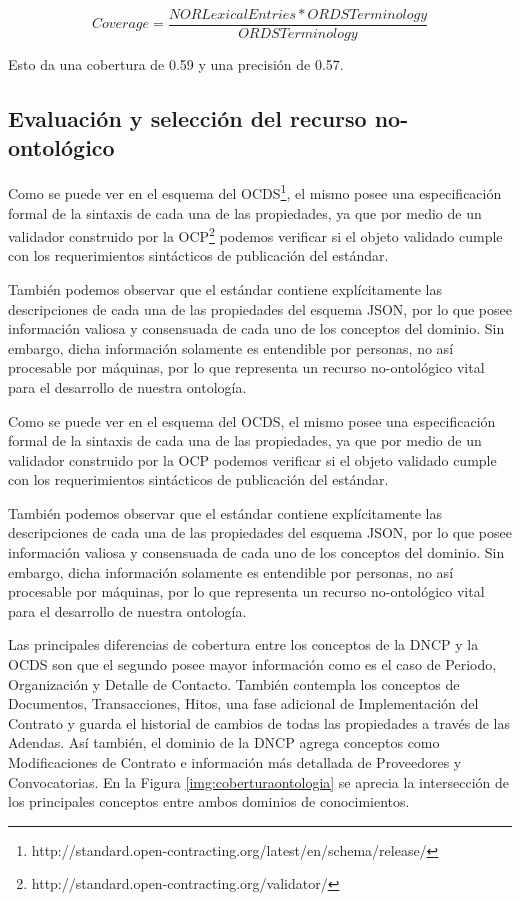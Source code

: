 \begin{equation}
    \label{eq:2}
     Coverage = \frac{{NORLexicalEntries}* {ORDSTerminology}}{{ORDSTerminology}}   
\end{equation}

Esto da una cobertura de 0.59 y una precisión de 0.57. 

\subsection{Evaluación y selección del recurso no-ontológico}

Como se puede ver en el esquema del OCDS\footnote{http://standard.open-contracting.org/latest/en/schema/release/}, el mismo posee una especificación formal de la sintaxis de cada una de las propiedades, ya que por medio de un validador construido por la OCP\footnote{http://standard.open-contracting.org/validator/} podemos verificar si el objeto validado cumple con los requerimientos sintácticos de publicación del estándar.

También podemos observar que el estándar contiene explícitamente las descripciones de cada una de las propiedades del esquema JSON, por lo que posee información valiosa y consensuada de cada uno de los conceptos del dominio. Sin embargo, dicha información solamente es entendible por personas, no así procesable por máquinas, por lo que representa un recurso no-ontológico vital para el desarrollo de nuestra ontología.

Como se puede ver en el esquema del OCDS, el mismo posee una especificación formal de la sintaxis de cada una de las propiedades, ya que por medio de un validador construido por la OCP podemos verificar si el objeto validado cumple con los requerimientos sintácticos de publicación del estándar.

También podemos observar que el estándar contiene explícitamente las descripciones de cada una de las propiedades del esquema JSON, por lo que posee información valiosa y consensuada de cada uno de los conceptos del dominio. Sin embargo, dicha información solamente es entendible por personas, no así procesable por máquinas, por lo que representa un recurso no-ontológico vital para el desarrollo de nuestra ontología.



Las principales diferencias de cobertura entre los conceptos de la DNCP y la OCDS son que el segundo posee mayor información como es el caso de Periodo, Organización y Detalle de Contacto. También contempla los conceptos de Documentos, Transacciones, Hitos, una fase adicional de Implementación del Contrato y guarda el historial de cambios de todas las propiedades a través de las Adendas. Así también, el dominio de la DNCP agrega conceptos como Modificaciones de Contrato e información más detallada de Proveedores y Convocatorias. En la Figura \ref{img:coberturaontologia} se aprecia la intersección de los principales conceptos entre ambos dominios de conocimientos.

